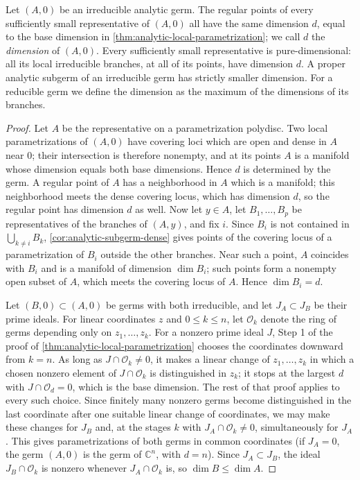 \begin{proposition}\label{prop:analytic-dimension-drop}
Let $(A,0)$ be an irreducible analytic germ. The regular points of every sufficiently small representative of $(A,0)$ all have the same dimension $d$, equal to the base dimension in \cref{thm:analytic-local-parametrization}; we call $d$ the \emph{dimension} of $(A,0)$. Every sufficiently small representative is pure-dimensional: all its local irreducible branches, at all of its points, have dimension $d$. A proper analytic subgerm of an irreducible germ has strictly smaller dimension. For a reducible germ we define the dimension as the maximum of the dimensions of its branches.
\end{proposition}
\begin{proof}
Let $A$ be the representative on a parametrization polydisc. Two local parametrizations of $(A,0)$ have covering loci which are open and dense in $A$ near $0$; their intersection is therefore nonempty, and at its points $A$ is a manifold whose dimension equals both base dimensions. Hence $d$ is determined by the germ. A regular point of $A$ has a neighborhood in $A$ which is a manifold; this neighborhood meets the dense covering locus, which has dimension $d$, so the regular point has dimension $d$ as well. Now let $y\in A$, let $B_1,\ldots,B_p$ be representatives of the branches of $(A,y)$, and fix $i$. Since $B_i$ is not contained in $\bigcup_{k\neq i}B_k$, \cref{cor:analytic-subgerm-dense} gives points of the covering locus of a parametrization of $B_i$ outside the other branches. Near such a point, $A$ coincides with $B_i$ and is a manifold of dimension $\dim B_i$; such points form a nonempty open subset of $A$, which meets the covering locus of $A$. Hence $\dim B_i=d$.

Let $(B,0)\subset(A,0)$ be germs with both irreducible, and let $J_A\subset J_B$ be their prime ideals. For linear coordinates $z$ and $0\leq k\leq n$, let $\mathcal O_k$ denote the ring of germs depending only on $z_1,\ldots,z_k$. For a nonzero prime ideal $J$, Step 1 of the proof of \cref{thm:analytic-local-parametrization} chooses the coordinates downward from $k=n$. As long as $J\cap\mathcal O_k\neq0$, it makes a linear change of $z_1,\ldots,z_k$ in which a chosen nonzero element of $J\cap\mathcal O_k$ is distinguished in $z_k$; it stops at the largest $d$ with $J\cap\mathcal O_d=0$, which is the base dimension. The rest of that proof applies to every such choice. Since finitely many nonzero germs become distinguished in the last coordinate after one suitable linear change of coordinates, we may make these changes for $J_B$ and, at the stages $k$ with $J_A\cap\mathcal O_k\neq0$, simultaneously for $J_A$. This gives parametrizations of both germs in common coordinates (if $J_A=0$, the germ $(A,0)$ is the germ of $\mathbb C^n$, with $d=n$). Since $J_A\subset J_B$, the ideal $J_B\cap\mathcal O_k$ is nonzero whenever $J_A\cap\mathcal O_k$ is, so $\dim B\leq\dim A$.


\end{proof}
